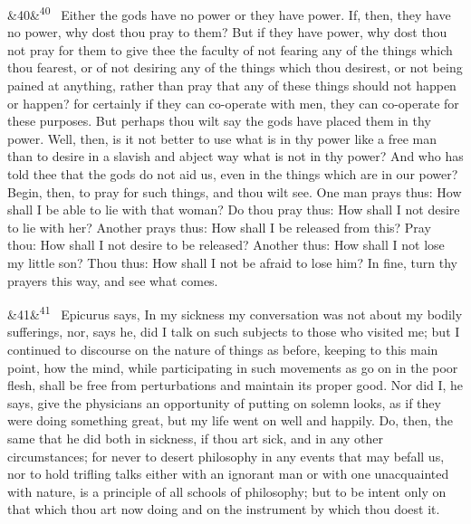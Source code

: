 \documentclass[12pt]{article}
\newcommand{\para}[1][]{\par\noindent\ifx&#1&\else\textsuperscript{\footnotesize #1}~\fi}
\begin{document}
\para[40] Either the gods have no power or they have power. If, then, they
have no power, why dost thou pray to them? But if they have power, why
dost thou not pray for them to give thee the faculty of not fearing any
of the things which thou fearest, or of not desiring any of the things
which thou desirest, or not being pained at anything, rather than pray
that any of these things should not happen or happen? for certainly if
they can co-operate with men, they can co-operate for these purposes.
But perhaps thou wilt say the gods have placed them in thy power. Well,
then, is it not better to use what is in thy power like a free man than
to desire in a slavish and abject way what is not in thy power? And who
has told thee that the gods do not aid us, even in the things which are
in our power? Begin, then, to pray for such things, and thou wilt see.
One man prays thus: How shall I be able to lie with that woman? Do thou
pray thus: How shall I not desire to lie with her? Another prays thus:
How shall I be released from this? Pray thou: How shall I not desire to
be released? Another thus: How shall I not lose my little son? Thou
thus: How shall I not be afraid to lose him? In fine, turn thy prayers
this way, and see what comes.

\para[41] Epicurus says, In my sickness my conversation was not about my
bodily sufferings, nor, says he, did I talk on such subjects to those
who visited me; but I continued to discourse on the nature of things as
before, keeping to this main point, how the mind, while participating in
such movements as go on in the poor flesh, shall be free from
perturbations and maintain its proper good. Nor did I, he says, give the
physicians an opportunity of putting on solemn looks, as if they were
doing something great, but my life went on well and happily. Do, then,
the same that he did both in sickness, if thou art sick, and in any
other circumstances; for never to desert philosophy in any events that
may befall us, nor to hold trifling talks either with an ignorant man or
with one unacquainted with nature, is a principle of all schools of
philosophy; but to be intent only on that which thou art now doing and
on the instrument by which thou doest it.
\end{document}
